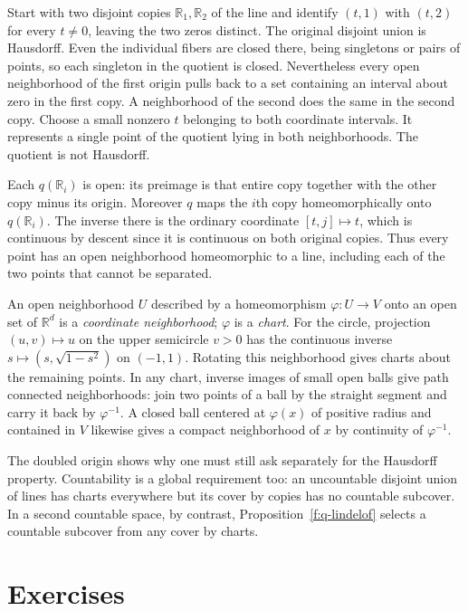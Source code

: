 \begin{example}\label{f:q-double-origin}
Start with two disjoint copies $\mathbb R_1,\mathbb R_2$ of the line and identify $(t,1)$ with $(t,2)$ for every $t\ne0$, leaving the two zeros distinct. The original disjoint union is Hausdorff. Even the individual fibers are closed there, being singletons or pairs of points, so each singleton in the quotient is closed. Nevertheless every open neighborhood of the first origin pulls back to a set containing an interval about zero in the first copy. A neighborhood of the second does the same in the second copy. Choose a small nonzero $t$ belonging to both coordinate intervals. It represents a single point of the quotient lying in both neighborhoods. The quotient is not Hausdorff.

Each $q(\mathbb R_i)$ is open: its preimage is that entire copy together with the other copy minus its origin. Moreover $q$ maps the $i$th copy homeomorphically onto $q(\mathbb R_i)$. The inverse there is the ordinary coordinate $[t,j]\mapsto t$, which is continuous by descent since it is continuous on both original copies. Thus every point has an open neighborhood homeomorphic to a line, including each of the two points that cannot be separated.
\end{example}

An open neighborhood $U$ described by a homeomorphism $\varphi:U\to V$ onto an open set of $\mathbb R^d$ is a \emph{coordinate neighborhood}; $\varphi$ is a \emph{chart}. For the circle, projection $(u,v)\mapsto u$ on the upper semicircle $v>0$ has the continuous inverse $s\mapsto(s,\sqrt{1-s^2})$ on $(-1,1)$. Rotating this neighborhood gives charts about the remaining points. In any chart, inverse images of small open balls give path connected neighborhoods: join two points of a ball by the straight segment and carry it back by $\varphi^{-1}$. A closed ball centered at $\varphi(x)$ of positive radius and contained in $V$ likewise gives a compact neighborhood of $x$ by continuity of $\varphi^{-1}$.

The doubled origin shows why one must still ask separately for the Hausdorff property. Countability is a global requirement too: an uncountable disjoint union of lines has charts everywhere but its cover by copies has no countable subcover. In a second countable space, by contrast, Proposition~\ref{f:q-lindelof} selects a countable subcover from any cover by charts.

\section{Exercises}

